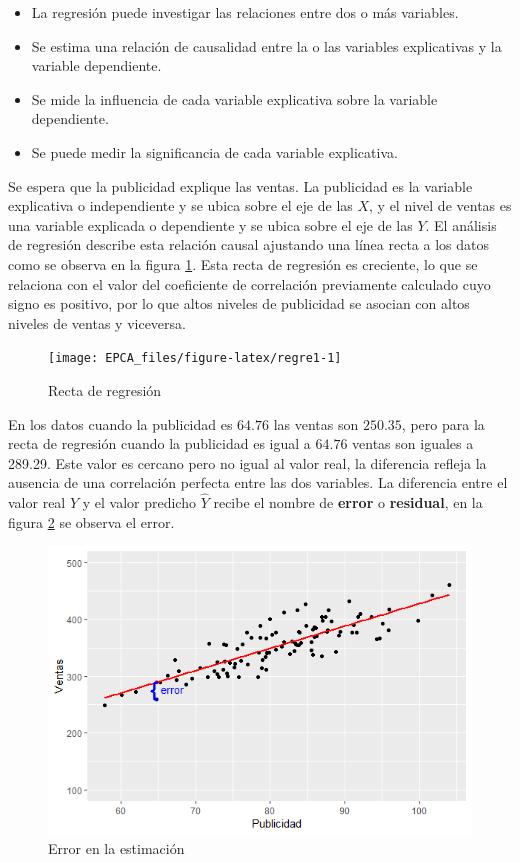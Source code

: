 \documentclass[
]{krantz}
\providecommand{\tightlist}{%
  \setlength{\itemsep}{0pt}\setlength{\parskip}{0pt}}
\begin{document}
\begin{itemize}
\tightlist
\item
  La regresión puede investigar las relaciones entre dos o más variables.
\item
  Se estima una relación de causalidad entre la o las variables explicativas y la variable dependiente.
\item
  Se mide la influencia de cada variable explicativa sobre la variable dependiente.
\item
  Se puede medir la significancia de cada variable explicativa.
\end{itemize}

Se espera que la publicidad explique las ventas. La publicidad es la variable explicativa o independiente y se ubica sobre el eje de las \(X\), y el nivel de ventas es una variable explicada o dependiente y se ubica sobre el eje de las \(Y\). El análisis de regresión describe esta relación causal ajustando una línea recta a los datos como se observa en la figura \ref{fig:regre1}. Esta recta de regresión es creciente, lo que se relaciona con el valor del coeficiente de correlación previamente calculado cuyo signo es positivo, por lo que altos niveles de publicidad se asocian con altos niveles de ventas y viceversa.

\begin{figure}[!h]

{\centering \texttt{[image: EPCA\_files/figure-latex/regre1-1]} 

}

\caption{Recta de regresión}\label{fig:regre1}
\end{figure}

En los datos cuando la publicidad es \(64.76\) las ventas son \(250.35\), pero para la recta de regresión cuando la publicidad es igual a \(64.76\) ventas son iguales a 289.29. Este valor es cercano pero no igual al valor real, la diferencia refleja la ausencia de una correlación perfecta entre las dos variables. La diferencia entre el valor real \(Y\) y el valor predicho \(\hat{Y}\) recibe el nombre de \textbf{error} o \textbf{residual}, en la figura \ref{fig:error1} se observa el error.

\begin{figure}[!h]

{\centering \includegraphics[width=0.6\linewidth]{error} 

}

\caption{Error en la estimación}\label{fig:error1}
\end{figure}
\end{document}
